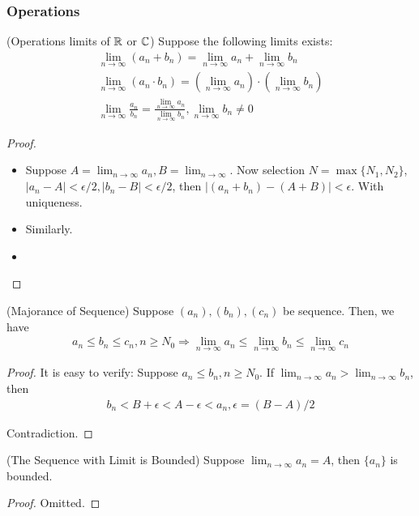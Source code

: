 \documentclass[Total.tex]{subfiles}
\begin{document}
			\subsubsection{Operations}
			\begin{proposition}
				(Operations limits of $\mathbb{R}$ or $\mathbb{C}$)  Suppose the following limits exists:
				\begin{gather*}
					\lim_{n\rightarrow \infty}(a_n+b_n)=\lim_{n\rightarrow \infty} a_n+ \lim_{n\rightarrow \infty} b_n\\
					\lim_{n\rightarrow \infty} (a_n\cdot b_n)=(\lim_{n\rightarrow \infty} a_n)\cdot(\lim_{n\rightarrow \infty} b_n)\\
					\lim_{n\rightarrow \infty} \frac{a_n}{b_n}=\frac{\lim_{n\rightarrow \infty} a_n}{\lim_{n\rightarrow \infty} b_n},\lim_{n\rightarrow \infty} b_n\not=0
				\end{gather*}
			\end{proposition}
			\begin{proof}
				\begin{itemize}
					\item  Suppose $A=\lim_{n\rightarrow \infty} a_n,B=\lim_{n\rightarrow \infty}$. Now selection $N=\max\{N_1,N_2\}$, $|a_n-A|<\epsilon/2,|b_n-B|<\epsilon/2$, then $|(a_n+b_n)-(A+B)|<\epsilon$. With uniqueness.
					\item Similarly.
					\item 
				\end{itemize}
			\end{proof}
			
			\begin{lemma}
				(Majorance of Sequence) Suppose $(a_n),(b_n),(c_n)$ be sequence. Then, we have
				\begin{gather*}
					a_n\leq b_n\leq c_n,n\geq N_0\Rightarrow \lim_{n\rightarrow \infty} a_n\leq \lim_{n\rightarrow \infty} b_n\leq \lim_{n\rightarrow \infty} c_n
				\end{gather*}
			\end{lemma}
			\begin{proof}
				It is easy to verify: Suppose $a_n\leq b_n,n\geq N_0$. If $\lim_{n\rightarrow \infty} a_n>\lim_{n\rightarrow \infty} b_n$, then 
				\begin{gather*}
					b_n<B+\epsilon<A-\epsilon<a_n,\epsilon=(B-A)/2
				\end{gather*}
				
				Contradiction.
			\end{proof}
			
			\begin{lemma}
				(The Sequence with Limit is Bounded) Suppose $\lim_{n\rightarrow \infty} a_n=A$, then $\{a_n\}$ is bounded.
			\end{lemma}
			\begin{proof}
				Omitted.
			\end{proof}
			
\end{document}
